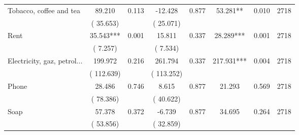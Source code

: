 \begin{tabular}{l*{7}{c}}
 Tobacco, coffee and tea       &             89.210       &        0.113  &            -12.428       &        0.877  &             53.281**       &              0.010 &  2718 \\ 
                       &       (      35.653)             &                               &       (      25.071)                     &                               &                                               &                                &                      \\ 

 Rent       &             35.543***       &        0.001  &             15.811       &        0.337  &             28.289***       &              0.001 &  2718 \\ 
                       &       (       7.257)             &                               &       (       7.534)                     &                               &                                               &                                &                      \\ 

 Electricity, gaz, petrol...       &            199.972       &        0.216  &            261.794       &        0.337  &            217.931***       &              0.004 &  2718 \\ 
                       &       (     112.639)             &                               &       (     113.252)                     &                               &                                               &                                &                      \\ 

 Phone       &             28.486       &        0.746  &              8.615       &        0.877  &             21.293       &              0.569 &  2718 \\ 
                       &       (      78.386)             &                               &       (      40.622)                     &                               &                                               &                                &                      \\ 

 Soap       &             57.378       &        0.372  &             -6.739       &        0.877  &             34.695       &              0.264 &  2718 \\ 
                       &       (      53.856)             &                               &       (      32.859)                     &                               &                                               &                                &                      \\ 


\end{tabular}
